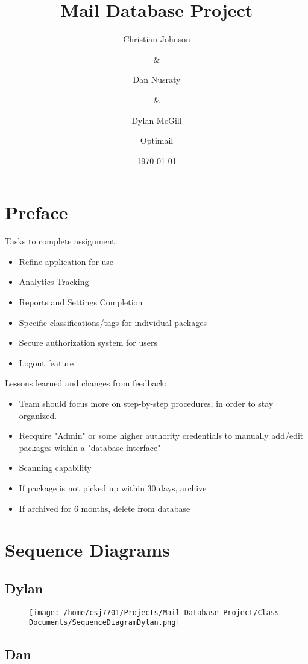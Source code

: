 \documentclass[11pt]{article}
\author{Christian Johnson\and\&\and Dan Nusraty\and\&\and Dylan McGill\and\newline Optimail}
\date{\today}
\title{Mail Database Project}
\begin{document}
\maketitle
\newpage
\section*{Preface}
\label{sec:org4986387}
Tasks to complete assignment:
\begin{itemize}
\item Refine application for use
\item Analytics Tracking
\item Reports and Settings Completion
\item Specific classifications/tags for individual packages
\item Secure authorization system for users
\item Logout feature
\end{itemize}


Lessons learned and changes from feedback:
\begin{itemize}
\item Team should focus more on step-by-step procedures, in order to stay organized.
\item Recquire "Admin" or some higher authority credentials to manually add/edit packages within a "database interface"
\item Scanning capability
\item If package is not picked up within 30 days, archive
\item If archived for 6 months, delete from database
\end{itemize}


\section*{Sequence Diagrams}
\label{sec:org73e1965}
\subsection*{Dylan}
\label{sec:orgd8df60e}
\begin{figure}[htbp]
\centering
\texttt{[image: /home/csj7701/Projects/Mail-Database-Project/Class-Documents/SequenceDiagramDylan.png]}
\bicaption{---}
\end{figure}

\subsection*{Dan}
\label{sec:orge097cf7}
\end{document}
